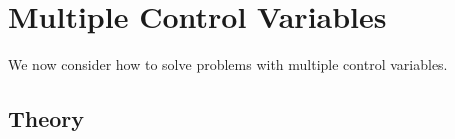 \documentclass[titlepage, headings=optiontotocandhead]{econtex}
\begin{document}

\hypertarget{multiple-control-variables}{}
\section{Multiple Control Variables}\label{sec:multiple-control-variables}
We now consider how to solve problems with multiple control variables.  

\subsection{Theory}\label{subsec:MCTheory}
\end{document}
